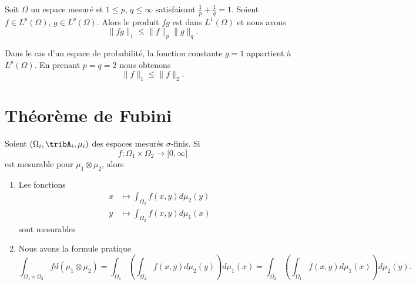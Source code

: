 \begin{proposition}
    Soit \( \Omega\) un espace mesuré et \( 1\leq p\), \( q\leq\infty\) satisfaisant \( \frac{1}{ p }+\frac{1}{ q }=1\). Soient \( f\in L^p(\Omega)\), \( g\in L^q(\Omega)\). Alors le produit \( fg\) est dans \( L^1(\Omega)\) et nous avons
    \begin{equation}
        \| fg \|_1\leq \| f \|_p\| g \|_q.
    \end{equation}
\end{proposition}

\begin{remark}      \label{RemNormuptNird}
    Dans le cas d'un espace de probabilité, la fonction constante \( g=1\) appartient à \( L^p(\Omega)\). En prenant \( p=q=2\) nous obtenons
    \begin{equation}
        \| f \|_1\leq\| f \|_2.
    \end{equation}
\end{remark}

\section{Théorème de Fubini}

\begin{theorem}
    Soient \( (\Omega_i,\tribA_i,\mu_i)\) des espaces mesurés $\sigma$-finis. Si
    \begin{equation}
        f\colon \Omega_1\times\Omega_2\to \mathopen[ 0 , \infty \mathclose]
    \end{equation}
    est mesurable pour \( \mu_1\otimes \mu_2\), alors
    \begin{enumerate}
        \item
            Les fonctions
            \begin{subequations}
                \begin{align}
                    x&\mapsto\int_{\Omega_2}f(x,y)d\mu_2(y)\\
                    y&\mapsto\int_{\Omega_2}f(x,y)d\mu_1(x)
                \end{align}
            \end{subequations}
            sont mesurables
        \item
            Nous avons la formule pratique
            \begin{equation}
                \int_{\Omega_1\times\Omega_2}fd(\mu_1\otimes\mu_2)=\int_{\Omega_1}\left( \int_{\Omega_2}f(x,y)d\mu_2(y) \right)d\mu_1(x)
                =\int_{\Omega_2}\left( \int_{\Omega_1}f(x,y)d\mu_1(x) \right)d\mu_2(y).
            \end{equation}
    \end{enumerate}
\end{theorem}

